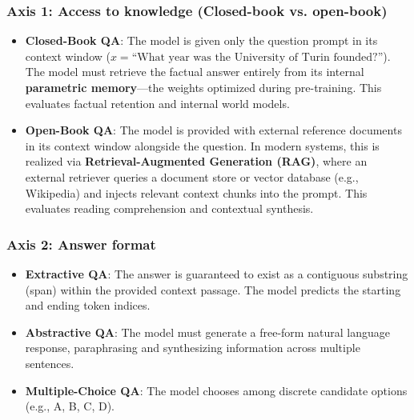 \documentclass[../../main.tex]{subfiles}
\begin{document}
\subsubsection{Axis 1: Access to knowledge (Closed-book vs. open-book)}
\begin{itemize}
    \item \textbf{Closed-Book QA}: The model is given only the question prompt in its context window ($x = \text{``What year was the University of Turin founded?''}$). The model must retrieve the factual answer entirely from its internal \textbf{parametric memory}---the weights optimized during pre-training. This evaluates factual retention and internal world models.
    \item \textbf{Open-Book QA}: The model is provided with external reference documents in its context window alongside the question. In modern systems, this is realized via \textbf{Retrieval-Augmented Generation (RAG)}, where an external retriever queries a document store or vector database (e.g., Wikipedia) and injects relevant context chunks into the prompt. This evaluates reading comprehension and contextual synthesis.
\end{itemize}

\subsubsection{Axis 2: Answer format}
\begin{itemize}
    \item \textbf{Extractive QA}: The answer is guaranteed to exist as a contiguous substring (span) within the provided context passage. The model predicts the starting and ending token indices.
    \item \textbf{Abstractive QA}: The model must generate a free-form natural language response, paraphrasing and synthesizing information across multiple sentences.
    \item \textbf{Multiple-Choice QA}: The model chooses among discrete candidate options (e.g., A, B, C, D).
\end{itemize}
\end{document}
